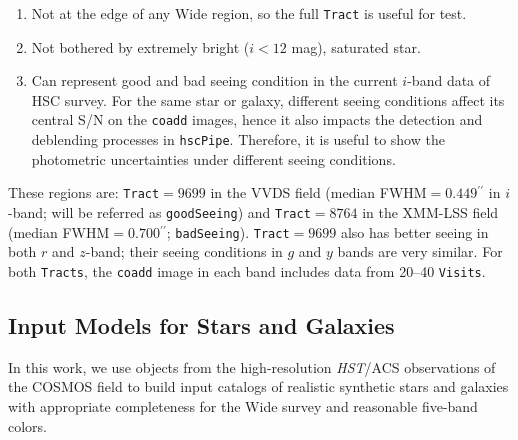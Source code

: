 \documentclass[useamsfonts]{pasj01}
\def\asec{$^{\prime\prime}$}
\def\hscpipe{\texttt{hscPipe}}
\def\tract{\texttt{Tract}}
\def\tracts{\texttt{Tracts}}
\def\visits{\texttt{Visits}}
\def\hst{{\textit{HST}}}
\begin{document}
    \begin{enumerate}
    
        \item Not at the edge of any Wide region, so the full \tract{} is 
            useful for test. 
        
        \item Not bothered by extremely bright ($i<12$ mag), saturated star. 
        
        \item Can represent good and bad seeing condition in the current $i$-band
            data of HSC survey.  
            For the same star or galaxy, different seeing conditions affect its 
            central S/N on the \texttt{coadd} images, hence it also impacts the 
            detection and deblending processes in \hscpipe{}. 
            Therefore, it is useful to show the photometric uncertainties under 
            different seeing conditions.
          
    \end{enumerate}
    
    \noindent These regions are: 
    \tract{}$=9699$ in the VVDS field (median FWHM$=0.449$\asec{} in $i$-band; 
    will be referred as \texttt{goodSeeing}) and
    \tract{}$=8764$ in the XMM-LSS field (median FWHM$=0.700$\asec{}; 
    \texttt{badSeeing}). 
    \tract{}$=9699$ also has better seeing in both $r$ and $z$-band; 
    their seeing conditions in $g$ and $y$ bands are very similar.    
    For both \tracts{}, the \texttt{coadd} image in each band includes data from 
    20--40 \visits{}. 
        

\subsection{Input Models for Stars and Galaxies}
    \label{ssec:inputs}
    
    In this work, we use objects from the high-resolution \hst{}/ACS observations of 
    the COSMOS field to build input catalogs of realistic synthetic stars and galaxies 
    with appropriate completeness for the Wide survey and reasonable five-band colors. 
    
\end{document}
